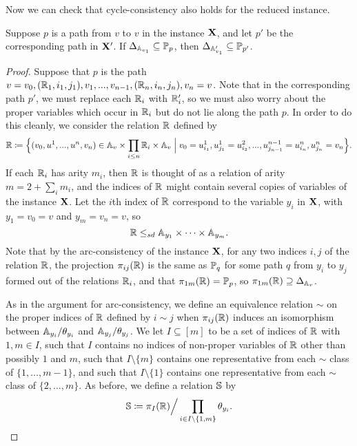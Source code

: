 \documentclass[letterpaper,11pt]{article}
\begin{document}
Now we can check that cycle-consistency also holds for the reduced instance.

\begin{lem}\label{ancestral-red-cycle} Suppose $p$ is a path from $v$ to $v$ in the instance $\mathbf{X}$, and let $p'$ be the corresponding path in $\mathbf{X}'$. If $\Delta_{\mathbb{A}_{v_1}} \subseteq \mathbb{P}_p$, then $\Delta_{\mathbb{A}_{v_1}'} \subseteq \mathbb{P}_{p'}$.
\end{lem}
\begin{proof} Suppose that $p$ is the path $v = v_0, (\mathbb{R}_1,i_1,j_1), v_1, ..., v_{n-1}, (\mathbb{R}_n,i_n,j_n), v_n = v$. Note that in the corresponding path $p'$, we must replace each $\mathbb{R}_i$ with $\mathbb{R}_i'$, so we must also worry about the proper variables which occur in $\mathbb{R}_i$ but do not lie along the path $p$. In order to do this cleanly, we consider the relation $\mathbb{R}$ defined by
\[
\mathbb{R} \coloneqq \Big\{(v_0, u^1, ..., u^n, v_n) \in \mathbb{A}_v \times \prod_{i \le n} \mathbb{R}_i \times \mathbb{A}_v \; \Big| \;
v_0 = u^1_{i_1}, u^1_{j_1} = u^2_{i_2}, ..., u^{n-1}_{j_{n-1}} = u^n_{i_n}, u^n_{j_n} = v_n\Big\}.
\]
If each $\mathbb{R}_i$ has arity $m_i$, then $\mathbb{R}$ is thought of as a relation of arity $m = 2 + \sum_i m_i$, and the indices of $\mathbb{R}$ might contain several copies of variables of the instance $\mathbf{X}$. Let the $i$th index of $\mathbb{R}$ correspond to the variable $y_i$ in $\mathbf{X}$, with $y_1 = v_0 = v$ and $y_m = v_n = v$, so
\[
\mathbb{R} \le_{sd} \mathbb{A}_{y_1} \times \cdots \times \mathbb{A}_{y_m}.
\]
Note that by the arc-consistency of the instance $\mathbf{X}$, for any two indices $i,j$ of the relation $\mathbb{R}$, the projection $\pi_{ij}(\mathbb{R})$ is the same as $\mathbb{P}_q$ for some path $q$ from $y_i$ to $y_j$ formed out of the relations $\mathbb{R}_i$, and that $\pi_{1m}(\mathbb{R}) = \mathbb{P}_p$, so $\pi_{1m}(\mathbb{R}) \supseteq \Delta_{\mathbb{A}_v}$.

As in the argument for arc-consistency, we define an equivalence relation $\sim$ on the proper indices of $\mathbb{R}$ defined by $i \sim j$ when $\pi_{ij}(\mathbb{R})$ induces an isomorphism between $\mathbb{A}_{y_i}/\theta_{y_i}$ and $\mathbb{A}_{y_j}/\theta_{y_j}$. We let $I \subseteq [m]$ to be a set of indices of $\mathbb{R}$ with $1, m \in I$, such that $I$ contains no indices of non-proper variables of $\mathbb{R}$ other than possibly $1$ and $m$, such that $I \setminus \{m\}$ contains one representative from each $\sim$ class of $\{1, ..., m-1\}$, and such that $I \setminus \{1\}$ contains one representative from each $\sim$ class of $\{2, ..., m\}$. As before, we define a relation $\mathbb{S}$ by
\[
\mathbb{S} \coloneqq \pi_I(\mathbb{R})\Big/\prod_{i \in I \setminus\{1,m\}} \theta_{y_i}.
\]


\end{proof}
\end{document}
